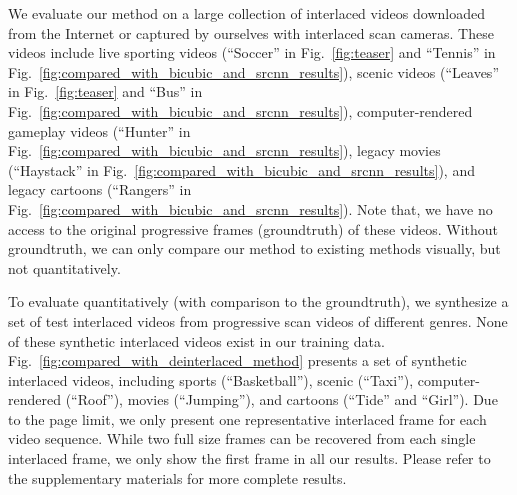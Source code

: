 \documentclass[acmtog]{acmart}
\begin{document}
We evaluate our method on a large collection of interlaced videos downloaded
from the Internet or captured by ourselves with interlaced scan cameras. These
videos include live sporting videos (``Soccer'' in
Fig.~\ref{fig:teaser} and ``Tennis'' in
Fig.~\ref{fig:compared_with_bicubic_and_srcnn_results}), scenic videos
(``Leaves'' in Fig.~\ref{fig:teaser} and ``Bus'' in
Fig.~\ref{fig:compared_with_bicubic_and_srcnn_results}), computer-rendered gameplay
videos (``Hunter'' in Fig.~\ref{fig:compared_with_bicubic_and_srcnn_results}),
legacy movies (``Haystack'' in
Fig.~\ref{fig:compared_with_bicubic_and_srcnn_results}), and legacy cartoons
(``Rangers'' in Fig.~\ref{fig:compared_with_bicubic_and_srcnn_results}).
Note that, we have no access to the original progressive frames (groundtruth) of 
these videos. Without groundtruth, we can only
compare our method to existing methods visually, but not quantitatively.

To evaluate quantitatively (with comparison to the groundtruth), we 
synthesize a set of test interlaced videos from progressive scan videos of different
genres. None of these synthetic interlaced videos exist in our training data.
Fig.~\ref{fig:compared_with_deinterlaced_method} presents a set of synthetic interlaced 
videos, including sports (``Basketball''), scenic
(``Taxi''), computer-rendered (``Roof''), movies (``Jumping''), and
cartoons (``Tide'' and ``Girl''). Due to the page limit, we only present one
representative interlaced frame for each video sequence. While two full size
frames can be recovered from each single interlaced frame, we only show the
first frame in all our results. Please refer to the supplementary materials for
more complete results.
\end{document}

